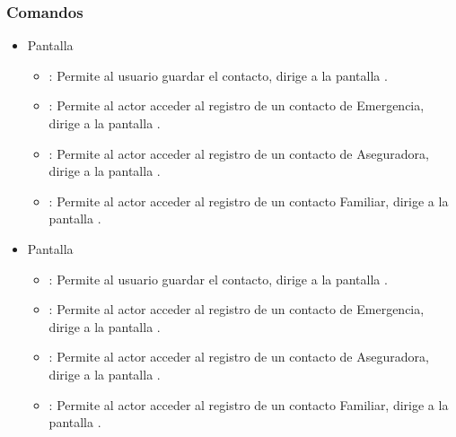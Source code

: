    

\subsubsection{Comandos}
    \begin{itemize}
    	
    	\item Pantalla 
    	
    	\begin{itemize}
    		\item {}: Permite al usuario guardar el contacto, dirige a la pantalla .
            \item \btnEmergencia[Emergencia]: Permite al actor acceder al registro de un contacto de Emergencia, dirige a la pantalla .
            \item \btnAseguradora[Aseguradora]: Permite al actor acceder al registro de un contacto de Aseguradora, dirige a la pantalla .
            \item \btnContacto[Familiar]: Permite al actor acceder al registro de un contacto Familiar, dirige a la pantalla .
    	\end{itemize}
    
		\item Pantalla 
		
		\begin{itemize}
			\item {}: Permite al usuario guardar el contacto, dirige a la pantalla .
            \item \btnEmergencia[Emergencia]: Permite al actor acceder al registro de un contacto de Emergencia, dirige a la pantalla .
            \item \btnAseguradora[Aseguradora]: Permite al actor acceder al registro de un contacto de Aseguradora, dirige a la pantalla .
            \item \btnContacto[Familiar]: Permite al actor acceder al registro de un contacto Familiar, dirige a la pantalla . 
		\end{itemize}


\end{itemize}

